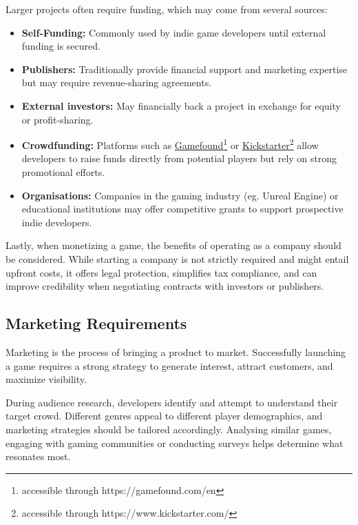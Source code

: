 Larger projects often require funding, which may come from several sources:
\begin{itemize}
	\item \textbf{Self-Funding:} Commonly used by indie game developers until external funding is secured\cite{perforce-stoftware_tips}.
	\item \textbf{Publishers:} Traditionally provide financial support and marketing expertise but may require revenue-sharing agreements\cite{perforce-stoftware_tips}.
	\item \textbf{External investors:} May financially back a project in exchange for equity or profit-sharing\cite{perforce-stoftware_tips}.
	\item \textbf{Crowdfunding:} Platforms such as \href{https://gamefound.com/en}{Gamefound}\footnote{accessible through https://gamefound.com/en} or \href{https://www.kickstarter.com/}{Kickstarter}\footnote{accessible through https://www.kickstarter.com/} allow developers to raise funds directly from potential players but rely on strong promotional efforts\cite{perforce-stoftware_tips}.
	\item \textbf{Organisations:} Companies in the gaming industry (eg. Unreal Engine) or educational institutions may offer competitive grants to support prospective indie developers\cite{perforce-stoftware_tips, unreal-engine_grants}.
\end{itemize}
Lastly, when monetizing a game, the benefits of operating as a company should be considered. While starting a company is not strictly required and might entail upfront costs, it offers legal protection, simplifies tax compliance, and can improve credibility when negotiating contracts with investors or publishers.

\subsection{Marketing Requirements}
Marketing is the process of bringing a product to market. Successfully launching a game requires a strong strategy to generate interest, attract customers, and maximize visibility.

During audience research, developers identify and attempt to understand their target crowd. Different genres appeal to different player demographics, and marketing strategies should be tailored accordingly. Analysing similar games, engaging with gaming communities or conducting surveys helps determine what resonates most.
\cite{santos_pre-launch}

